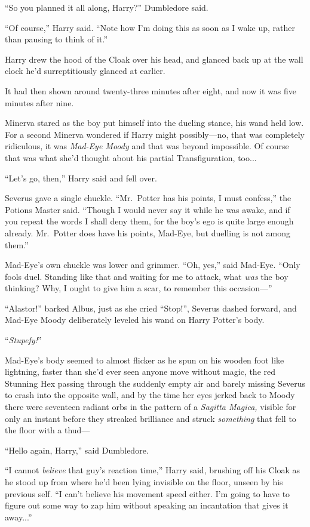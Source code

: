“So you planned it all along, Harry?” Dumbledore said.

“Of course,” Harry said. “Note how I’m doing this as soon as I wake up, rather than pausing to think of it.”

Harry drew the hood of the Cloak over his head, and glanced back up at the wall clock he’d surreptitiously glanced at earlier.

It had then shown around twenty-three minutes after eight, and now it was five minutes after nine.
\sbreak

Minerva stared as the boy put himself into the dueling stance, his wand held low. For a second Minerva wondered if Harry might possibly—no, that was completely ridiculous, it was \emph{Mad-Eye Moody} and that was beyond impossible. Of course that was what she’d thought about his partial Transfiguration, too...

“Let’s go, then,” Harry said and fell over.

Severus gave a single chuckle. “Mr.~Potter has his points, I must confess,” the Potions Master said. “Though I would never say it while he was awake, and if you repeat the words I shall deny them, for the boy’s ego is quite large enough already. Mr.~Potter does have his points, Mad-Eye, but duelling is not among them.”

Mad-Eye’s own chuckle was lower and grimmer. “Oh, yes,” said Mad-Eye. “Only fools duel. Standing like that and waiting for me to attack, what \emph{was} the boy thinking? Why, I ought to give him a scar, to remember this occasion—”

“Alastor!” barked Albus, just as she cried “Stop!”, Severus dashed forward, and Mad-Eye Moody deliberately leveled his wand on Harry Potter’s body.

“\emph{Stupefy!}”

Mad-Eye’s body seemed to almost flicker as he spun on his wooden foot like lightning, faster than she’d ever seen anyone move without magic, the red Stunning Hex passing through the suddenly empty air and barely missing Severus to crash into the opposite wall, and by the time her eyes jerked back to Moody there were seventeen radiant orbs in the pattern of a \emph{Sagitta Magica,} visible for only an instant before they streaked brilliance and struck \emph{something} that fell to the floor with a thud—
\sbreak

“Hello again, Harry,” said Dumbledore.

“I cannot \emph{believe} that guy’s reaction time,” Harry said, brushing off his Cloak as he stood up from where he’d been lying invisible on the floor, unseen by his previous self. “I can’t believe his movement speed either. I’m going to have to figure out some way to zap him without speaking an incantation that gives it away...”
\sbreak

